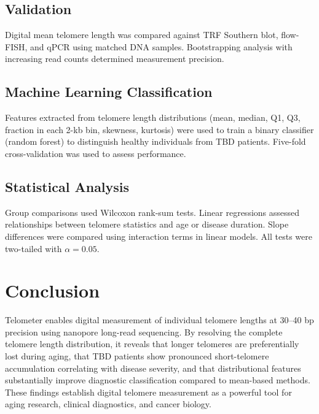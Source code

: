 \documentclass[11pt]{article}
\begin{document}
\subsection{Validation}

Digital mean telomere length was compared against TRF Southern blot, flow-FISH, and qPCR using matched DNA samples. Bootstrapping analysis with increasing read counts determined measurement precision.

\subsection{Machine Learning Classification}

Features extracted from telomere length distributions (mean, median, Q1, Q3, fraction in each 2-kb bin, skewness, kurtosis) were used to train a binary classifier (random forest) to distinguish healthy individuals from TBD patients. Five-fold cross-validation was used to assess performance.

\subsection{Statistical Analysis}

Group comparisons used Wilcoxon rank-sum tests. Linear regressions assessed relationships between telomere statistics and age or disease duration. Slope differences were compared using interaction terms in linear models. All tests were two-tailed with $\alpha = 0.05$.

\section{Conclusion}

Telometer enables digital measurement of individual telomere lengths at 30--40 bp precision using nanopore long-read sequencing. By resolving the complete telomere length distribution, it reveals that longer telomeres are preferentially lost during aging, that TBD patients show pronounced short-telomere accumulation correlating with disease severity, and that distributional features substantially improve diagnostic classification compared to mean-based methods. These findings establish digital telomere measurement as a powerful tool for aging research, clinical diagnostics, and cancer biology.



\end{document}
